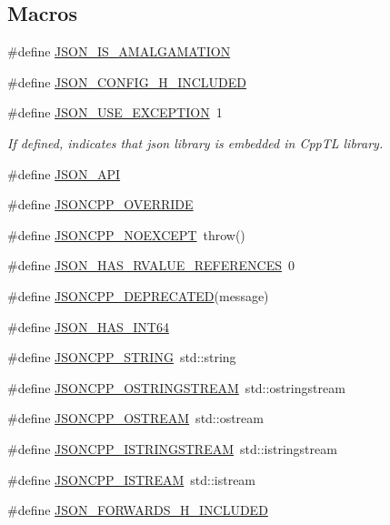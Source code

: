 \subsection*{Macros}
\begin{DoxyCompactItemize}
\item 
\#define \hyperlink{json-forwards_8h_a1bf16856b5e907aa83ed7bc825bc5ecf}{J\+S\+O\+N\+\_\+\+I\+S\+\_\+\+A\+M\+A\+L\+G\+A\+M\+A\+T\+I\+ON}
\item 
\#define \hyperlink{json-forwards_8h_a71f1a94bee4773f2a6e30eeac7deb963}{J\+S\+O\+N\+\_\+\+C\+O\+N\+F\+I\+G\+\_\+\+H\+\_\+\+I\+N\+C\+L\+U\+D\+ED}
\item 
\#define \hyperlink{json-forwards_8h_a51968e67b1462ac893f87a0fc8b791cd}{J\+S\+O\+N\+\_\+\+U\+S\+E\+\_\+\+E\+X\+C\+E\+P\+T\+I\+ON}~1
\begin{DoxyCompactList}\small\item\em If defined, indicates that json library is embedded in Cpp\+TL library. \end{DoxyCompactList}\item 
\#define \hyperlink{json-forwards_8h_a1d61ffde86ce1a18fd83194ff0d9a206}{J\+S\+O\+N\+\_\+\+A\+PI}
\item 
\#define \hyperlink{json-forwards_8h_a824d6199c91488107e443226fa6022c5}{J\+S\+O\+N\+C\+P\+P\+\_\+\+O\+V\+E\+R\+R\+I\+DE}
\item 
\#define \hyperlink{json-forwards_8h_af8418c6d82d9de6e5f3c739fcf2fe88d}{J\+S\+O\+N\+C\+P\+P\+\_\+\+N\+O\+E\+X\+C\+E\+PT}~throw()
\item 
\#define \hyperlink{json-forwards_8h_a978860f0e3983ca76a4e5af28d9bccd4}{J\+S\+O\+N\+\_\+\+H\+A\+S\+\_\+\+R\+V\+A\+L\+U\+E\+\_\+\+R\+E\+F\+E\+R\+E\+N\+C\+ES}~0
\item 
\#define \hyperlink{json-forwards_8h_a6933a4321aa03c8a29016669073f1af6}{J\+S\+O\+N\+C\+P\+P\+\_\+\+D\+E\+P\+R\+E\+C\+A\+T\+ED}(message)
\item 
\#define \hyperlink{json-forwards_8h_a210f7d060accd6a881cd070dc7a333a4}{J\+S\+O\+N\+\_\+\+H\+A\+S\+\_\+\+I\+N\+T64}
\item 
\#define \hyperlink{json-forwards_8h_a1e723f95759de062585bc4a8fd3fa4be}{J\+S\+O\+N\+C\+P\+P\+\_\+\+S\+T\+R\+I\+NG}~std\+::string
\item 
\#define \hyperlink{json-forwards_8h_a1d06ac2ca63c8c521f41231dfda0e6b3}{J\+S\+O\+N\+C\+P\+P\+\_\+\+O\+S\+T\+R\+I\+N\+G\+S\+T\+R\+E\+AM}~std\+::ostringstream
\item 
\#define \hyperlink{json-forwards_8h_a37a25be5fca174927780caeb280094ce}{J\+S\+O\+N\+C\+P\+P\+\_\+\+O\+S\+T\+R\+E\+AM}~std\+::ostream
\item 
\#define \hyperlink{json-forwards_8h_a1b5d70fe3d83273d200193177ded4c25}{J\+S\+O\+N\+C\+P\+P\+\_\+\+I\+S\+T\+R\+I\+N\+G\+S\+T\+R\+E\+AM}~std\+::istringstream
\item 
\#define \hyperlink{json-forwards_8h_a15f2f70b2ce0a2abd0f8112393dbc4de}{J\+S\+O\+N\+C\+P\+P\+\_\+\+I\+S\+T\+R\+E\+AM}~std\+::istream
\item 
\#define \hyperlink{json-forwards_8h_ac320ccec4dca293f3f50f35f7a595f3b}{J\+S\+O\+N\+\_\+\+F\+O\+R\+W\+A\+R\+D\+S\+\_\+\+H\+\_\+\+I\+N\+C\+L\+U\+D\+ED}
\end{DoxyCompactItemize}
